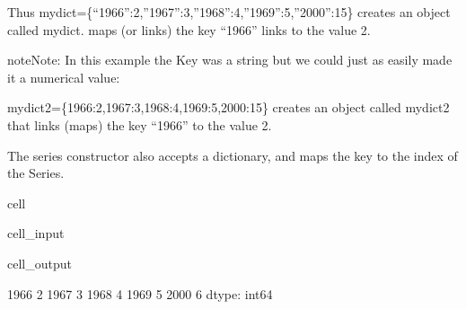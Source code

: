 \documentclass[letterpaper,10pt,english]{jupyterBook}
\begin{document}
\sphinxAtStartPar
Thus mydict=\{“1966”:2,”1967”:3,”1968”:4,”1969”:5,”2000”:\sphinxhyphen{}15\} creates an object called mydict.   maps (or links) the key “1966” links to the value 2.

\begin{sphinxadmonition}{note}{Note:}
\sphinxAtStartPar
In this example the Key was a string but we could just as easily made it a numerical value:
\end{sphinxadmonition}

\sphinxAtStartPar
mydict2=\{1966:2,1967:3,1968:4,1969:5,2000:\sphinxhyphen{}15\} creates an object called mydict2 that links (maps) the key “1966” to the value 2.

\sphinxAtStartPar
The series constructor also accepts a dictionary, and maps the key to the index of the Series.

\begin{sphinxuseclass}{cell}\begin{sphinxVerbatimInput}

\begin{sphinxuseclass}{cell_input}
\begin{sphinxVerbatim}[commandchars=\\\{\}]
\end{sphinxVerbatim}

\end{sphinxuseclass}\end{sphinxVerbatimInput}
\begin{sphinxVerbatimOutput}

\begin{sphinxuseclass}{cell_output}
\begin{sphinxVerbatim}[commandchars=\\\{\}]
1966    2
1967    3
1968    4
1969    5
2000    6
dtype: int64
\end{sphinxVerbatim}

\end{sphinxuseclass}\end{sphinxVerbatimOutput}

\end{sphinxuseclass}
\end{document}
